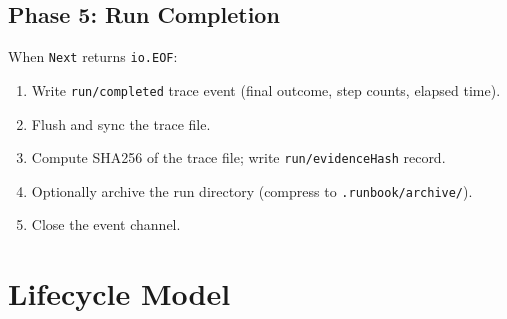 \subsection{Phase 5: Run Completion}

When \texttt{Next} returns \texttt{io.EOF}:
\begin{enumerate}
  \item Write \texttt{run/completed} trace event (final outcome, step counts, elapsed time).
  \item Flush and sync the trace file.
  \item Compute SHA256 of the trace file; write \texttt{run/evidenceHash} record.
  \item Optionally archive the run directory (compress to \texttt{.runbook/archive/}).
  \item Close the event channel.
\end{enumerate}

\section{Lifecycle Model}

